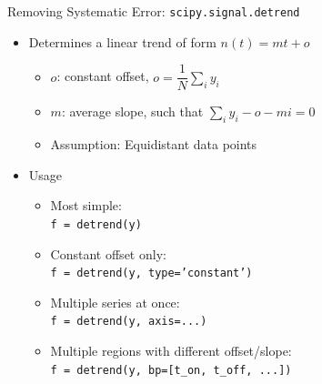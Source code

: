 
\begin{frame}{Removing Systematic Error: \texttt{scipy.signal.detrend}}
%
\begin{itemize}
\item Determines a linear trend of form $n(t) = mt + o$
	\begin{itemize}
	\item $o$: constant offset, $o = \dfrac{1}{N} \sum_i y_i$
	\item $m$: average slope, such that $\sum_i y_i - o - mi = 0$
	\item[\Thus] Assumption: Equidistant data points
	\end{itemize}
\item Usage
	\begin{itemize}
	\item Most simple: \\
		\texttt{f = detrend(y)}
	\item Constant offset only: \\
		\texttt{f = detrend(y, type='constant')}
	\item Multiple series at once: \\
		\texttt{f = detrend(y, axis=...)}
	\item Multiple regions with different offset/slope: \\
		\texttt{f = detrend(y, bp=[t\_on, t\_off, ...])}
	\end{itemize}
\end{itemize}
%
\end{frame}


